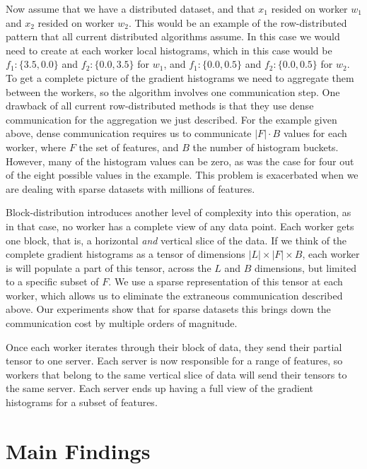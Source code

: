 Now assume that we have a distributed dataset, and that $x_1$ resided on worker $w_1$ and $x_2$ resided on worker $w_2$. This would
be an example of the row-distributed pattern that all current distributed algorithms assume.
In this case we would need to create at each worker local histograms, which
in this case would be $f_1: \{3.5, 0.0\}$ and $f_2: \{0.0, 3.5\}$ for $w_1$, and $f_1: \{0.0, 0.5\}$ and $f_2: \{0.0, 0.5\}$ for $w_2$. To get a complete picture of the gradient histograms
we need to aggregate them between the workers, so the algorithm involves one communication
step. One drawback of all current row-distributed methods is that they use dense communication
for the aggregation we just described. For the example given above, dense communication
requires us to communicate $|F| \cdot B$ values for each worker, where $F$ the set of features,
and $B$ the number of histogram buckets. However,
many of the histogram values can be zero, as was the case for four out of the eight possible
values in the example. This problem is exacerbated when we are dealing with sparse
datasets with millions of features.

Block-distribution introduces another level of complexity into this operation, as
in that case, no worker has a complete view of any data point. Each worker gets one block,
that is, a horizontal \emph{and} vertical slice of the data. If we think of the complete
gradient histograms as a tensor of dimensions $|L| \times |F| \times B$, each worker is
will populate a part of this tensor, across the $L$ and $B$ dimensions, but limited to a specific
subset of $F$. We use a sparse representation of this tensor at each worker, which allows
us to eliminate the extraneous communication described above. Our experiments show
that for sparse datasets this brings down the communication cost by multiple orders
of magnitude.

Once each worker iterates
through their block of data, they send their partial tensor to one server. Each server
is now responsible for a range of features, so workers that belong to the same vertical
slice of data will send their tensors to the same server. Each server ends up having
a full view of the gradient histograms for a subset of features.


\section{Main Findings}
\label{sec:block-gbt-results}
